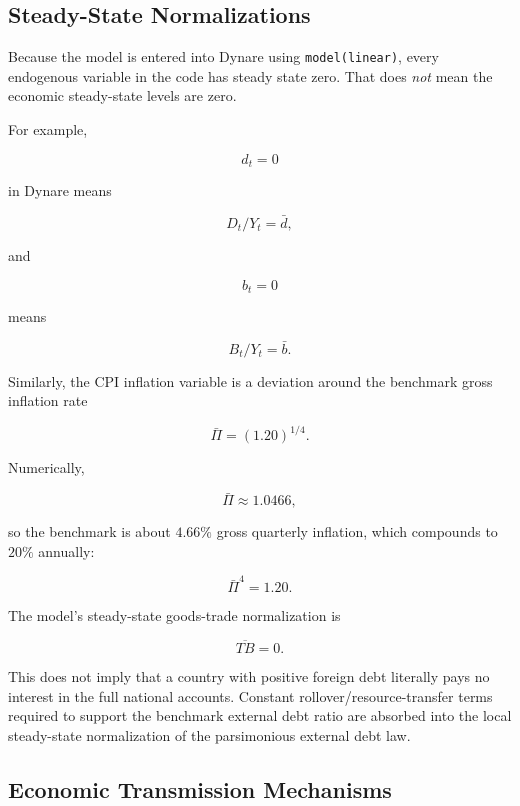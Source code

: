 \subsection{Steady-State Normalizations}
\label{app:steady_state}

Because the model is entered into Dynare using \texttt{model(linear)}, every
endogenous variable in the code has steady state zero. That does \emph{not}
mean the economic steady-state levels are zero.

For example,

\[
d_t=0
\]

in Dynare means

\[
D_t/Y_t=\bar d,
\]

and

\[
b_t=0
\]

means

\[
B_t/Y_t=\bar b.
\]

Similarly, the CPI inflation variable is a deviation around the benchmark gross
inflation rate

\begin{equation}
\bar\Pi=(1.20)^{1/4}.
\end{equation}

Numerically,

\begin{equation}
\bar\Pi \approx 1.0466,
\end{equation}

so the benchmark is about \(4.66\%\) gross quarterly inflation, which
compounds to \(20\%\) annually:

\begin{equation}
\bar\Pi^4=1.20.
\end{equation}

The model's steady-state goods-trade normalization is

\[
\overline{TB}=0.
\]

This does not imply that a country with positive foreign debt literally pays no
interest in the full national accounts. Constant rollover/resource-transfer
terms required to support the benchmark external debt ratio are absorbed into
the local steady-state normalization of the parsimonious external debt law.

\subsection{Economic Transmission Mechanisms}
\label{app:transmission}

